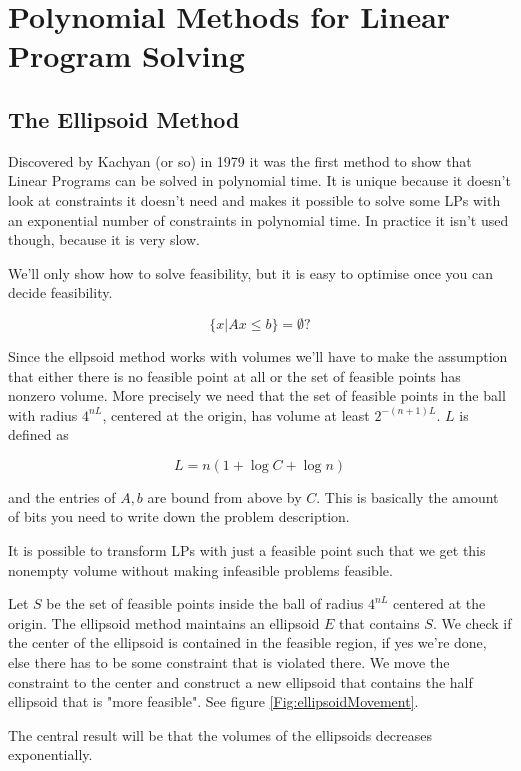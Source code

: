 \chapter{Polynomial Methods for Linear Program Solving}

\section{The Ellipsoid Method}

Discovered by Kachyan (or so) in 1979 it was the first method to show that Linear Programs can be solved in polynomial time. It is unique because it doesn't look at constraints it doesn't need and makes it possible to solve some LPs with an exponential number of constraints in polynomial time. In practice it isn't used though, because it is very slow.

We'll only show how to solve feasibility, but it is easy to optimise once you can decide feasibility.

\[\{x|Ax\leq b\} = \emptyset?\]

Since the ellpsoid method works with volumes we'll have to make the assumption that either there is no feasible point at all or the set of feasible points has nonzero volume. More precisely we need that the set of feasible points in the ball with radius $4^{nL}$, centered at the origin, has volume at least $2^{-(n+1)L}$. $L$ is defined as 

\[L=n(1+\log C+\log n)\]

and the entries of $A,b$ are bound from above by $C$. This is basically the amount of bits you need to write down the problem description.

It is possible to transform LPs with just a feasible point such that we get this nonempty volume without making infeasible problems feasible.

Let $S$ be the set of feasible points inside the ball of radius $4^{nL}$ centered at the origin. The ellipsoid method maintains an ellipsoid $E$ that contains $S$. We check if the center of the ellipsoid is contained in the feasible region, if yes we're done, else there has to be some constraint that is violated there. We move the constraint to the center and construct a new ellipsoid that contains the half ellipsoid that is "more feasible". See figure \ref{Fig:ellipsoidMovement}.

The central result will be that the volumes of the ellipsoids decreases exponentially.

